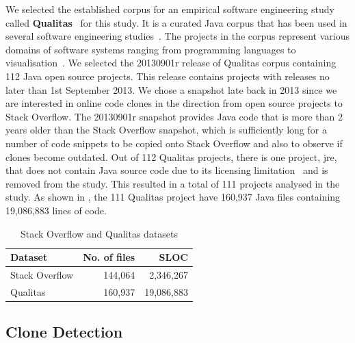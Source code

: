 \documentclass[sigconf,review, anonymous]{acmart}
\begin{document}
We selected the established corpus for an empirical software
engineering study called \textbf{Qualitas}~\cite{QualitasCorpus} for
this study. It is a curated Java corpus that has been used in several
software engineering
studies~\cite{Taube-Schock2011,Beckman2011,Vasilescu2011,Omar2012}. The
projects in the corpus represent various domains of software systems
ranging from programming languages to
visualisation~\cite{QualitasCorpus}. We selected the 20130901r release
of Qualitas corpus containing 112 Java open source projects. This
release contains projects with releases no later than 1st September
2013. We chose a snapshot late back in 2013 since we are interested in
online code clones in the direction from open source projects to Stack
Overflow. The 20130901r snapshot provides Java code that is more than
2 years older than the Stack Overflow snapshot, which is sufficiently
long for a number of code snippets to be copied onto Stack Overflow
and also to observe if clones become outdated. Out of 112 Qualitas
projects, there is one project, \textsf{jre}, that does not contain
Java source code due to its licensing limitation~\cite{QualitasCorpus}
and is removed from the study. This resulted in a total of 111
projects analysed in the study. As shown in , the
111 Qualitas project have 160,937 Java files containing 19,086,883
lines of
code. %

\begin{table}
  \centering
  \caption{Stack Overflow and Qualitas datasets}
  \label{tab:datasets}
  \small
  \begin{tabular}{lrr}
    \hline 
    Dataset & No. of files & SLOC \\
    \hline
    Stack Overflow & 144,064 & 2,346,267 \\ 
    Qualitas &  160,937 & 19,086,883 \\ 
    \hline 
  \end{tabular} 
\end{table}

\subsection{Clone Detection}
\end{document}
